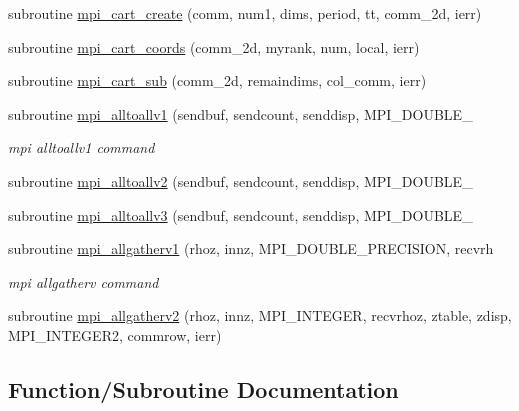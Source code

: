 \begin{DoxyCompactItemize}
\item 
subroutine \mbox{\hyperlink{namespacempistub_ae0b8402fe840a321a5e4eabbda8ecb43}{mpi\+\_\+cart\+\_\+create}} (comm, num1, dims, period, tt, comm\+\_\+2d, ierr)
\item 
subroutine \mbox{\hyperlink{namespacempistub_a599bb38fd4a9f405ced50d48c09116ca}{mpi\+\_\+cart\+\_\+coords}} (comm\+\_\+2d, myrank, num, local, ierr)
\item 
subroutine \mbox{\hyperlink{namespacempistub_ab9ac48f74bbcdf05669e63852a220c09}{mpi\+\_\+cart\+\_\+sub}} (comm\+\_\+2d, remaindims, col\+\_\+comm, ierr)
\item 
subroutine \mbox{\hyperlink{namespacempistub_aa93ced1f07150fe7c8d11a35a0b77b1f}{mpi\+\_\+alltoallv1}} (sendbuf, sendcount, senddisp, M\+P\+I\+\_\+\+D\+O\+U\+B\+L\+E\+\_\+
\begin{DoxyCompactList}\small\item\em mpi alltoallv1 command \end{DoxyCompactList}\item 
subroutine \mbox{\hyperlink{namespacempistub_ac85c372d1990a0cfd2b6cb31a0be0b47}{mpi\+\_\+alltoallv2}} (sendbuf, sendcount, senddisp, M\+P\+I\+\_\+\+D\+O\+U\+B\+L\+E\+\_\+
\item 
subroutine \mbox{\hyperlink{namespacempistub_a9e2b2b4a1d6bda704e33a2acfcfb9cfd}{mpi\+\_\+alltoallv3}} (sendbuf, sendcount, senddisp, M\+P\+I\+\_\+\+D\+O\+U\+B\+L\+E\+\_\+
\item 
subroutine \mbox{\hyperlink{namespacempistub_a35fa927935bbf54e76460692ed2ae189}{mpi\+\_\+allgatherv1}} (rhoz, innz, M\+P\+I\+\_\+\+D\+O\+U\+B\+L\+E\+\_\+\+P\+R\+E\+C\+I\+S\+I\+ON, recvrh
\begin{DoxyCompactList}\small\item\em mpi allgatherv command \end{DoxyCompactList}\item 
subroutine \mbox{\hyperlink{namespacempistub_a107fe42e9088982af86dbfe11fe0ac33}{mpi\+\_\+allgatherv2}} (rhoz, innz, M\+P\+I\+\_\+\+I\+N\+T\+E\+G\+ER, recvrhoz, ztable, zdisp, M\+P\+I\+\_\+\+I\+N\+T\+E\+G\+E\+R2, commrow, ierr)
\end{DoxyCompactItemize}


\subsection{Function/\+Subroutine Documentation}
\mbox{\label{namespacempistub_a61c97c834a766b0372d758a4158ae7da}} 
